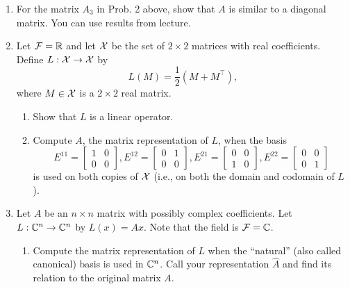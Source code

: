 \documentclass[letterpaper]{article}
\begin{document}
\begin{enumerate}
\item For the matrix $A_3$ in Prob. 2 above, show that $A$ is similar to a diagonal matrix. You can use results from lecture.

\item Let ${\mathcal F}=\mathbb R$ and let $\cal X$ be the set of $2 \times 2$ matrices with real coefficients. Define $L:{\cal X} \to {\cal  X}$ by
$$ L(M) = \frac{1}{2}( M+M^\top),$$
where $M\in {\cal X}$ is a $2 \times 2$ real matrix.

\begin{enumerate}
\setlength{\itemsep}{.1in}
\renewcommand{\labelenumi}{(\alph{enumi})}
\item Show that $L$ is a linear operator.

\item Compute $A$, the matrix representation of $L$, when the basis
$$ E^{11} = \left[ \begin{array}{cc} 1 & 0  \\ 0& 0 \end{array} \right],  E^{12} = \left[ \begin{array}{cc} 0 & 1  \\ 0& 0 \end{array} \right],  E^{21} = \left[ \begin{array}{cc} 0 & 0  \\ 1& 0 \end{array} \right],  E^{22} = \left[ \begin{array}{cc} 0 & 0  \\ 0& 1 \end{array} \right]$$
is used on both copies of $\cal X$ (i.e., on both the domain and codomain of $L$).

\end{enumerate}

\item  Let $A$ be an $n \times n$ matrix with possibly complex coefficients. Let $L: {\mathbb C^n} \to {\mathbb C}^n$ by $L(x) = Ax$. Note that the field is $\mathcal{F} = \mathbb C$.

    \begin{enumerate}
\setlength{\itemsep}{.1in}
\renewcommand{\labelenumi}{(\alph{enumi})}

\item Compute the matrix representation of $L$ when the ``natural'' (also called canonical) basis is used in ${\mathbb C}^n$.  Call your representation $\hat A$ and find its relation to the original matrix $A$.


\end{enumerate}
\end{enumerate}
\end{document}
